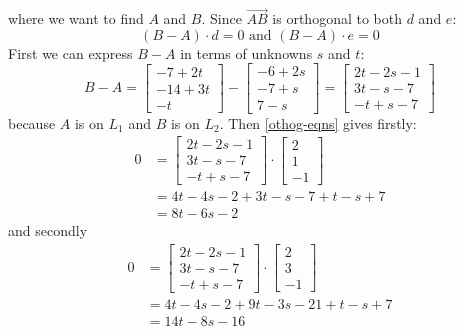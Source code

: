 \documentclass{article}
\begin{document}
\begin{Answer}
where we want to find $A$ and $B$.
Since $\vec{AB}$ is orthogonal to both $d$ and $e$:
\begin{equation}\label{othog-eqns}
  (B-A)\cdot d = 0 \text{ and }
  (B-A)\cdot e = 0
\end{equation}
First we can express $B-A$ in terms of unknowns $s$ and $t$:
\begin{equation*}
B-A = \left[
\begin{array}{c}
-7+2t\\
-14+3t\\
-t
\end{array}
\right] - \left[
\begin{array}{c}
-6+2s\\
-7 +s\\
7-s
\end{array}
\right] = 
\left[
\begin{array}{c}
2t-2s-1\\
3t-s-7\\
-t+s-7
\end{array}
\right]
\end{equation*}
because $A$ is on $L_1$ and $B$ is on $L_2$. Then \ref{othog-eqns} gives firstly:
\begin{align*}
0 &= \left[
\begin{array}{c}
2t-2s-1\\
3t-s-7\\
-t+s-7
\end{array}
\right]\cdot \left[
\begin{array}{c}
2\\
1\\
-1
\end{array}
\right] \\
&= 4t-4s-2 +3t-s-7+t-s+7\\
&= 8t -6s -2
\end{align*}
and secondly
\begin{align*}
0 &= \left[
\begin{array}{c}
2t-2s-1\\
3t-s-7\\
-t+s-7
\end{array}
\right]\cdot \left[
\begin{array}{c}
2\\
3\\
-1
\end{array}
\right] \\
&= 4t-4s-2+9t-3s-21+t-s+7\\
&= 14t -8s -16
\end{align*}

\end{Answer}
\end{document}

